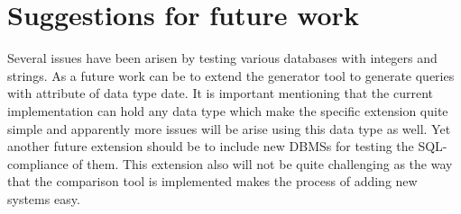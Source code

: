 \section{Suggestions for future work}
Several issues have been arisen by testing various databases with integers and strings. As a future work can be to extend the generator tool to generate queries with attribute of data type date. It is important mentioning that the current implementation can hold any data type which make the specific extension quite simple and apparently more issues will be arise using this data type as well. Yet another future extension should be to include new DBMSs for testing the SQL-compliance of them. This extension also will not be quite challenging as the way that the comparison tool is implemented makes the process of adding new systems easy. 
